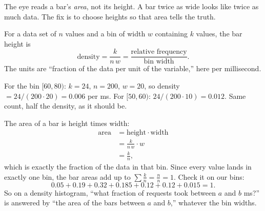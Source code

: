 The eye reads a bar's \emph{area}, not its height. A bar twice as wide looks like twice as
much data. The fix is to choose heights so that area tells the truth.

\begin{definition}
For a data set of $n$ values and a bin of width $w$ containing $k$ values, the bar height is
\[
  \text{density} = \frac{k}{n\,w} = \frac{\text{relative frequency}}{\text{bin width}}.
\]
The units are ``fraction of the data per unit of the variable,'' here per millisecond.
\end{definition}

For the bin $[60,80)$: $k=24$, $n=200$, $w=20$, so density $= 24/(200\cdot 20) = 0.006$ per ms.
For $[50,60)$: $24/(200\cdot 10) = 0.012$. Same count, half the density, as it should be.

\begin{whybox}
The area of a bar is height times width:
\begin{align*}
  \text{area} &= \text{height} \cdot \text{width} \\
  &= \frac{k}{n\,w} \cdot w \\
  &= \frac{k}{n},
\end{align*}
which is exactly the fraction of the data in that bin. Since every value lands in exactly one
bin, the bar areas add up to $\sum \frac{k}{n} = \frac{n}{n} = 1$. Check it on our bins:
\[
  0.05 + 0.19 + 0.32 + 0.185 + 0.12 + 0.12 + 0.015 = 1.
\]
So on a density histogram, ``what fraction of requests took between $a$ and $b$ ms?'' is
answered by ``the area of the bars between $a$ and $b$,'' whatever the bin widths.
\end{whybox}

